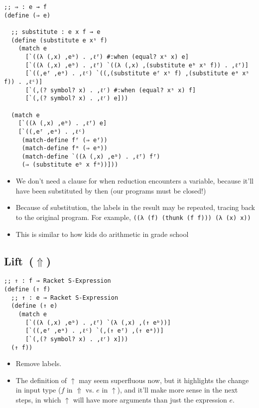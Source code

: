 \documentclass[12pt, oneside]{book}
\begin{document}
\begin{Verbatim}
;; ⇒ : e → f
(define (⇒ e)

  ;; substitute : e x f → e
  (define (substitute e xˢ f)
    (match e
      [`((λ (,x) ,eᵇ) . ,ℓᶠ) #:when (equal? xˢ x) e]
      [`((λ (,x) ,eᵇ) . ,ℓᶠ) `((λ (,x) ,(substitute eᵇ xˢ f)) . ,ℓᶠ)]
      [`((,eᶠ ,eᵃ) . ,ℓᶜ) `((,(substitute eᶠ xˢ f) ,(substitute eᵃ xˢ f)) . ,ℓᶜ)]
      [`(,(? symbol? x) . ,ℓʳ) #:when (equal? xˢ x) f]
      [`(,(? symbol? x) . ,ℓʳ) e]))

  (match e
    [`((λ (,x) ,eᵇ) . ,ℓᶠ) e]
    [`((,eᶠ ,eᵃ) . ,ℓᶜ)
     (match-define fᶠ (⇒ eᶠ))
     (match-define fᵃ (⇒ eᵃ))
     (match-define `((λ (,x) ,eᵇ) . ,ℓᶠ) fᶠ)
     (⇒ (substitute eᵇ x fᵃ))]))
\end{Verbatim}

\begin{itemize}
  \item We don’t need a clause for when reduction encounters a variable, because it’ll have been substituted by then (our programs must be closed!)
  \item Because of substitution, the labels in the result may be repeated, tracing back to the original program. For example, \texttt{((λ (f) (thunk (f f))) (λ (x) x))}
  \item This is similar to how kids do arithmetic in grade school
\end{itemize}

\subsection{Lift~(\(⇑\))}

\begin{Verbatim}
;; ⇑ : f → Racket S-Expression
(define (⇑ f)
  ;; ↑ : e → Racket S-Expression
  (define (↑ e)
    (match e
      [`((λ (,x) ,eᵇ) . ,ℓᶠ) `(λ (,x) ,(↑ eᵇ))]
      [`((,eᶠ ,eᵃ) . ,ℓᶜ) `(,(↑ eᶠ) ,(↑ eᵃ))]
      [`(,(? symbol? x) . ,ℓʳ) x]))
  (↑ f))
\end{Verbatim}

\begin{itemize}
  \item Remove labels.
  \item The definition of \(↑\) may seem superfluous now, but it highlights the change in input type (\(f\) in \(⇑\) vs. \(e\) in \(↑\)), and it’ll make more sense in the next steps, in which \(↑\) will have more arguments than just the expression \(e\).
\end{itemize}
\end{document}

